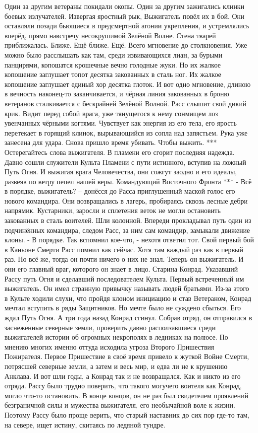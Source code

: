 \documentclass[a4paper, 12pt]{report}
\begin{document}
Один за другим ветераны покидали окопы. Один за другим зажигались клинки боевых излучателей. 
Извергая яростный рык, Выжигатель повёл их в бой. Они оставляли позади бьющиеся в предсмертной агонии укрепления, и устремлялись вперёд, прямо навстречу несокрушимой Зелёной Волне. 
Стена тварей приближалась. Ближе. Ещё ближе. Ещё. Всего мгновение до столкновения. Уже можно было расслышать как там, среди извивающихся лиан, за бурыми панцирями, копошатся крошечные вечно голодные жуки. Но их жалкое копошение заглушает топот десятка закованных в сталь ног. Их жалкое копошение заглушает единый хор десятка глоток.
И вот одно мгновение, длиною в вечность наконец-то заканчивается, и чёрная линия закованных в броню ветеранов сталкивается с бескрайней Зелёной Волной.
Расс слышит свой дикий крик. Видит перед собой врага, уже тянущегося к нему сонмищем лоз увенчанных чёрными когтями. Чувствует как энергия из его тела, его ярость перетекает в горящий клинок, вырывающийся из сопла над запястьем. Рука уже занесена для удара.
Снова пришло время убивать.
Чтобы выжить. 
***
Остерегайтесь слова выжигателя. В пламени его сгорит последняя надежда. Давно сошли служители Культа Пламени с пути истинного, вступив на ложный Путь Огня. И выжигая врага Человечества, они сожгут заодно и его идеалы, развеяв по ветру пепел нашей веры.
Командующий Восточного Фронта
***
- Всё в порядке, выжигатель? – донёсся до Расса приглушенный маской голос его нового командира. Они возвращались в лагерь, пробираясь сквозь лесные дебри напрямик. Кустарники, заросли и сплетения веток не могли остановить закованных в сталь воителей. Шли колонной. Впереди прокладывал путь один из подчинённых командира, следом Расс, за ним сам командир, замыкали движение клоны.
- В порядке. Так вспомнил кое-что, - нехотя ответил тот.
Свой первый бой в Каньоне Смерти Расс помнил как сейчас. Хотя там каждый раз как в первый раз. Но всё же, тогда он почти ничего о них не знал. Теперь он выжигатель. И они его главный враг, которого он знает в лицо. 
Старина Конрад. Указавший Рассу путь Огня и сделавший последователем Культа. Первый встреченный им выжигатель. Он имел странную привычку называть людей братьями. Из-за этого в Культе ходили слухи, что пройдя клоном инициацию и став Ветераном, Конрад мечтал вступить в ряды Защитников. Но мечте было не суждено сбыться. Его ждал Путь Огня.
А три года назад Конрад сгинул. Собрав отряд, он отправился в заснеженные северные земли, проверить давно расползавшиеся среди выжигателей истории об огромных некрополях в ледниках на полюсе. По мнению многих именно оттуда исходила угроза Второго Пришествия Пожирателя. Первое Пришествие в своё время привело к жуткой Войне Смерти, потрясшей северные земли, а затем и весь мир, и едва ли не к крушению Анклава. И вот шли годы, а Конрад так и не возвращался. Как и никто из его отряда. Рассу было трудно поверить, что такого могучего воителя как Конрад, могло что-то остановить. В конце концов, он не раз был свидетелем проявлений безграничной силы и мужества выжигателя, его необычайной воле к жизни. Поэтому Рассу было проще верить, что старый наставник до сих пор где-то там, на севере, ищет истину, скитаясь по ледяной тундре.
\end{document}
